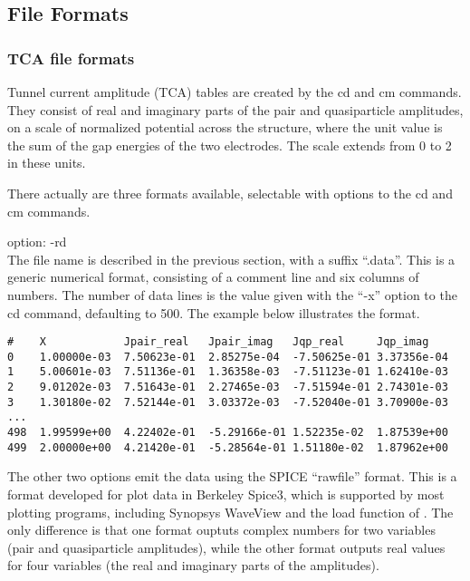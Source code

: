 \subsection{File Formats}


\subsubsection{TCA file formats}

Tunnel current amplitude (TCA) tables are created by the {\vt cd} and
{\vt cm} commands.  They consist of real and imaginary parts of the
pair and quasiparticle amplitudes, on a scale of normalized potential
across the structure, where the unit value is the sum of the gap
energies of the two electrodes.  The scale extends from 0 to 2 in
these units.

There actually are three formats available, selectable with options to
the {\vt cd} and {\vt cm} commands.

\begin{description}
\item{option: {\vt -rd}}\\
The file name is described in the previous section, with a suffix
``{\vt .data}''.  This is a generic numerical format, consisting of a
comment line and six columns of numbers.  The number of data lines is
the value given with the ``{\vt -x}'' option to the {\vt cd} command,
defaulting to 500.  The example below illustrates the format.
\end{description}

\begin{verbatim}
#    X            Jpair_real   Jpair_imag   Jqp_real     Jqp_imag
0    1.00000e-03  7.50623e-01  2.85275e-04  -7.50625e-01 3.37356e-04
1    5.00601e-03  7.51136e-01  1.36358e-03  -7.51123e-01 1.62410e-03
2    9.01202e-03  7.51643e-01  2.27465e-03  -7.51594e-01 2.74301e-03
3    1.30180e-02  7.52144e-01  3.03372e-03  -7.52040e-01 3.70900e-03
...
498  1.99599e+00  4.22402e-01  -5.29166e-01 1.52235e-02  1.87539e+00
499  2.00000e+00  4.21420e-01  -5.28564e-01 1.51180e-02  1.87962e+00
\end{verbatim}

The other two options emit the data using the SPICE ``rawfile''
format.  This is a format developed for plot data in Berkeley Spice3,
which is supported by most plotting programs, including Synopsys
WaveView and the {\cb load} function of {\WRspice}.  The only
difference is that one format ouptuts complex numbers for two
variables (pair and quasiparticle amplitudes), while the other format
outputs real values for four variables (the real and imaginary parts
of the amplitudes).

